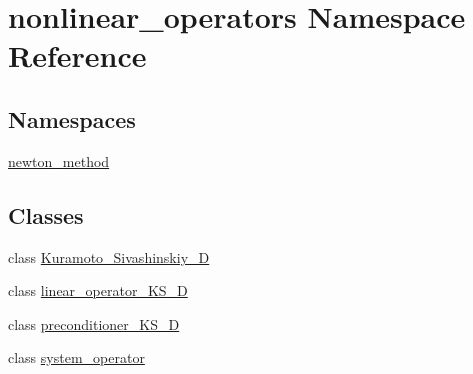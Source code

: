 \hypertarget{namespacenonlinear__operators}{\section{nonlinear\-\_\-operators Namespace Reference}
\label{namespacenonlinear__operators}
}
\subsection*{Namespaces}
\begin{DoxyCompactItemize}
\item 
\hyperlink{namespacenonlinear__operators_1_1newton__method}{newton\-\_\-method}
\end{DoxyCompactItemize}
\subsection*{Classes}
\begin{DoxyCompactItemize}
\item 
class \hyperlink{classnonlinear__operators_1_1Kuramoto__Sivashinskiy__2D}{Kuramoto\-\_\-\-Sivashinskiy\-\_\-D}
\item 
class \hyperlink{classnonlinear__operators_1_1linear__operator__KS__2D}{linear\-\_\-operator\-\_\-\-K\-S\-\_\-D}
\item 
class \hyperlink{classnonlinear__operators_1_1preconditioner__KS__2D}{preconditioner\-\_\-\-K\-S\-\_\-D}
\item 
class \hyperlink{classnonlinear__operators_1_1system__operator}{system\-\_\-operator}
\end{DoxyCompactItemize}
